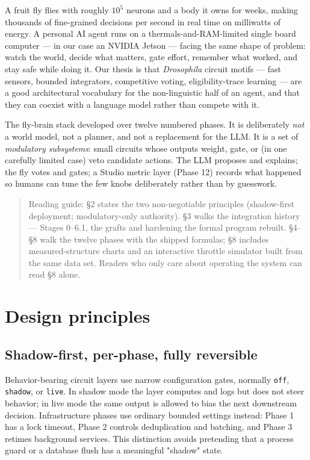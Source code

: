 \documentclass[11pt]{article}
\begin{document}
A fruit fly flies with roughly \(10^5\) neurons and a body it owns for weeks, making thousands of fine-grained decisions per second in real time on milliwatts of energy. A personal AI agent runs on a thermals-and-RAM-limited single board computer — in our case an NVIDIA Jetson — facing the same shape of problem: watch the world, decide what matters, gate effort, remember what worked, and stay safe while doing it. Our thesis is that \emph{Drosophila} circuit motifs — fast sensors, bounded integrators, competitive voting, eligibility-trace learning — are a good architectural vocabulary for the non-linguistic half of an agent, and that they can coexist with a language model rather than compete with it.

The fly-brain stack developed over twelve numbered phases. It is deliberately \emph{not} a world model, not a planner, and not a replacement for the LLM. It is a set of \emph{modulatory subsystems}: small circuits whose outputs weight, gate, or (in one carefully limited case) veto candidate actions. The LLM proposes and explains; the fly votes and gates; a Studio metric layer (Phase 12) records what happened so humans can tune the few knobs deliberately rather than by guesswork.

\begin{quote}
Reading guide: §2 states the two non-negotiable principles (shadow-first deployment; modulatory-only authority). §3 walks the integration history — Stages 0–6.1, the grafts and hardening the formal program rebuilt. §4–§8 walk the twelve phases with the shipped formulas; §8 includes measured-structure charts and an interactive throttle simulator built from the same data set. Readers who only care about operating the system can read §8 alone.
\end{quote}
\section{Design principles}

\subsection{Shadow-first, per-phase, fully reversible}

Behavior-bearing circuit layers use narrow configuration gates, normally \texttt{off}, \texttt{shadow}, or \texttt{live}. In shadow mode the layer computes and logs but does not steer behavior; in live mode the same output is allowed to bias the next downstream decision. Infrastructure phases use ordinary bounded settings instead: Phase 1 has a lock timeout, Phase 2 controls deduplication and batching, and Phase 3 retimes background services. This distinction avoids pretending that a process guard or a database flush has a meaningful "shadow" state.
\end{document}
